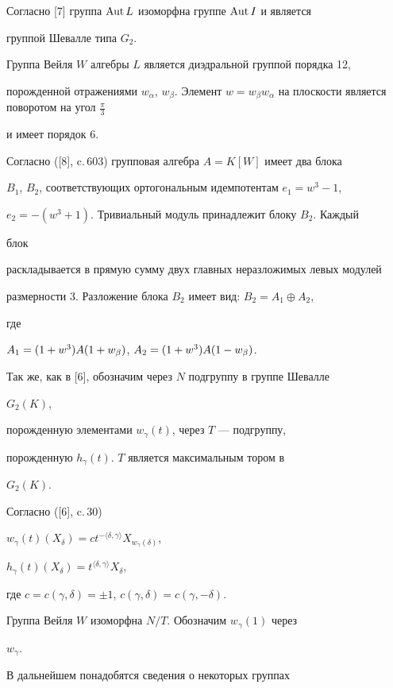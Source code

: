 Согласно [7] группа $\operatorname{Aut} L$ изоморфна группе $\operatorname{Aut} I$ и является 


группой Шевалле типа $G_{2}$. 


Группа Вейля $W$ алгебры $L$ является диэдральной группой порядка 12, 


порожденной отражениями $w_\alpha$, $w_\beta$. Элемент $w=w_\beta 


w_\alpha$ на плоскости является поворотом на угол $\frac{\pi}{3}$ 


и имеет порядок 6. 


Согласно ([8], c.\,603) групповая алгебра $A=K[W]$ имеет два блока 


$B_1$, $B_2$, соответствующих ортогональным идемпотентам $e_1=w^3-1$, 


$e_2=-(w^3+1)$. Тривиальный модуль принадлежит блоку $B_2$. Каждый 


блок 


раскладывается в прямую сумму двух главных неразложимых левых модулей 


размерности 3. Разложение блока $B_2$ имеет вид: $B_2=A_1\oplus A_2$, 


где 


$A_1=(1+w^3)A(1+w_{\beta})$, $A_2= (1+w^3)A(1-w_{\beta})$. 


 


Так же, как в [6], обозначим через $N$ подгруппу в группе Шевалле 


$G_2(K)$, 


порожденную элементами $w_{\gamma}(t)$, через $T$ --- подгруппу, 


порожденную $h_{\gamma}(t)$.\; $T$ является максимальным тором в 


$G_{2}(K)$. 


Согласно ([6], c.\,30) 


$w_{\gamma}(t)(X_{\delta})= 


ct^{-\langle \delta,\gamma\rangle}X_{w_{\gamma}(\delta)}$, 


$h_{\gamma}(t)(X_{\delta})=t^{\langle \delta,\gamma\rangle}X_{\delta}$, 


где $c=c(\gamma,\delta)=\pm1$, $c(\gamma,\delta)=c(\gamma,-\delta)$. 


Группа Вейля $W$ изоморфна $N/T$. Обозначим $w_{\gamma}(1)$ через 


$w_{\gamma}$. 


 


В дальнейшем понадобятся сведения о некоторых группах 


